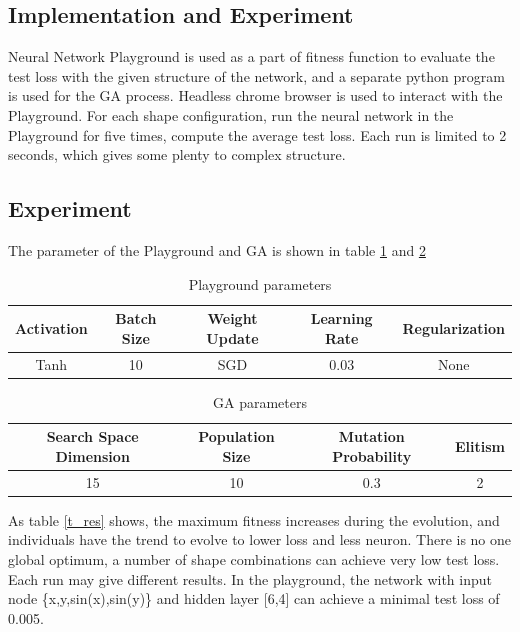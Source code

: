 \documentclass[12pt]{article}
\begin{document}
\subsection{Implementation and Experiment}
Neural Network Playground is used as a part of fitness function to evaluate the test loss with the given structure of the network, and a separate python program is used for the GA process.
Headless chrome browser is used to interact with the Playground. For each shape configuration, run the neural network in the Playground for five times, compute the average test loss. Each run is limited to 2 seconds, which gives some plenty to complex structure.

\subsection{Experiment}
The parameter of the Playground and GA is shown in table \ref{t_p} and \ref{t_g}

\begin{table}[!ht]
\centering
\begin{tabular}{ccccc}
\toprule
Activation  & Batch Size & Weight Update & Learning Rate & Regularization \\ \midrule
Tanh & 10 & SGD & 0.03 & None  \\
\bottomrule
\end{tabular}
\caption{Playground parameters}
\label{t_p}
\end{table}
\begin{table}[!ht]
\centering
\begin{tabular}{cccc}
\toprule
Search Space Dimension & Population Size  & Mutation Probability & Elitism  \\ \midrule
15 & 10 & 0.3 & 2   \\
\bottomrule
\end{tabular}
\caption{GA parameters}
\label{t_g}
\end{table}

As table \ref{t_res} shows, the maximum fitness increases during the evolution, and individuals have the trend to evolve to lower loss and less neuron. There is no one global optimum, a number of shape combinations can achieve very low test loss. Each run may give different results. In the playground, the network with input node \{x,y,sin(x),sin(y)\} and hidden layer [6,4] can achieve a minimal test loss of 0.005.
\end{document}
